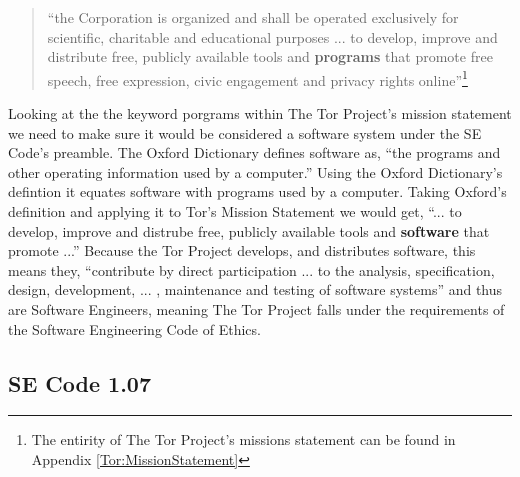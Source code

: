\documentclass[11pt]{article}
\begin{document}
\begin{multicols}{2}
\begin{quotation}
  ``the Corporation is organized and shall be operated exclusively for scientific,
  charitable and educational purposes ... to develop, improve and distribute
  free, publicly available tools and \textbf{programs} that promote free speech, free
expression, civic engagement and privacy rights online''\footnote{ The entirity
of The Tor Project's missions statement can be found in Appendix
\ref{Tor:MissionStatement}} \cite{TOR:Sponsorship} 
\end{quotation}

Looking at the the keyword porgrams within The Tor Project's mission statement
we need to make sure it would be considered a software system under the SE
Code's preamble. The Oxford Dictionary defines software as, ``the programs and other operating
information used by a computer.''\cite{defn:Software} Using the Oxford
Dictionary's defintion it equates software with programs used by a computer.
Taking Oxford's definition and applying it to Tor's Mission Statement we would
get, ``... to develop, improve and distrube free, publicly available tools and
\textbf{software} that promote ...''
Because the Tor Project develops, and distributes software, this means they, ``contribute by
direct participation ...  to the analysis, specification, design, development,
... , maintenance and testing of software systems'' and thus are Software
Engineers, meaning The Tor Project falls under the requirements of the Software
Engineering Code of Ethics.\cite{Tor:FAQ, Tor:Overview} 


\subsection{SE Code 1.07} 


\end{multicols}
\end{document}
